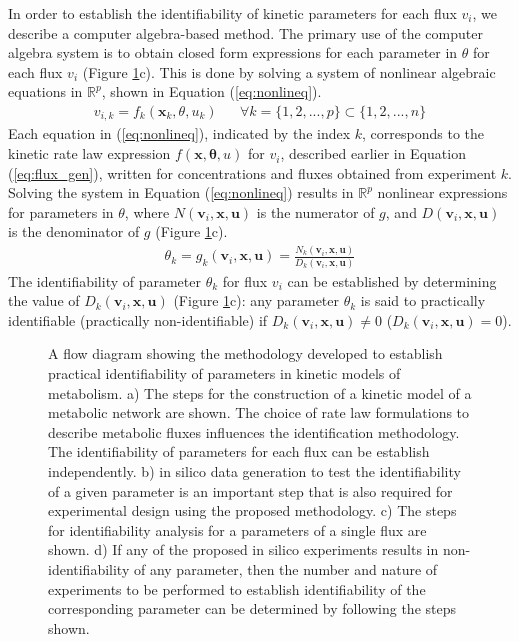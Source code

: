 \documentclass[10pt]{article}
\begin{document}
In order to establish the identifiability of kinetic parameters for each flux $v_i$, we describe a computer algebra-based method. The primary use of the computer algebra system is to obtain closed form expressions for each parameter in $\theta$ for each flux $v_i$ (Figure \ref{fig:ident-flowchart}c). This is done by solving a system of nonlinear algebraic equations in $\mathbb{R}^p$, shown in Equation (\ref{eq:nonlineq}).
\begin{align}\label{eq:nonlineq}
v_{i, k} = f_k(\mathbf{x}_k,\theta, u_k) && \forall k=\{1, 2, ..., p\}\subset\{1, 2, ..., n\}
\end{align}
Each equation in (\ref{eq:nonlineq}), indicated by the index $k$, corresponds to the kinetic rate law expression $f(\mathbf{x},\mathbf{\theta}, u)$ for $v_i$, described earlier in Equation (\ref{eq:flux_gen}), written for concentrations and fluxes obtained from experiment $k$. Solving the system in Equation (\ref{eq:nonlineq}) results in $\mathbb{R}^p$ nonlinear expressions for parameters in $\theta$, where $N(\mathbf{v}_i, \mathbf{x}, \mathbf{u})$ is the numerator of $g$, and $D(\mathbf{v}_i, \mathbf{x}, \mathbf{u})$ is the denominator of $g$ (Figure \ref{fig:ident-flowchart}c).
\begin{align}\label{eq:theta-eq}
\theta_k = g_k(\mathbf{v}_i, \mathbf{x}, \mathbf{u}) = \frac{N_k(\mathbf{v}_i, \mathbf{x}, \mathbf{u})}{D_k(\mathbf{v}_i, \mathbf{x}, \mathbf{u})}
\end{align}
The identifiability of parameter $\theta_k$ for flux $v_i$ can be established by determining the value of $D_k(\mathbf{v}_i, \mathbf{x}, \mathbf{u})$ (Figure \ref{fig:ident-flowchart}c): any parameter $\theta_k$ is said to practically identifiable (practically non-identifiable) if $D_k(\mathbf{v}_i, \mathbf{x}, \mathbf{u})\neq0$ ($D_k(\mathbf{v}_i, \mathbf{x}, \mathbf{u}) = 0$). 

\begin{figure}[!tbhp]
	\caption{A flow diagram showing the methodology developed to establish practical identifiability of parameters in kinetic models of metabolism. a) The steps for the construction of a kinetic model of a metabolic network are shown. The choice of rate law formulations to describe metabolic fluxes influences the identification methodology. The identifiability of parameters for each flux can be establish independently. b) in silico data generation to test the identifiability of a given parameter is an important step that is also required for experimental design using the proposed methodology. c) The steps for identifiability analysis for a parameters of a single flux are shown. d) If any of the proposed in silico experiments results in non-identifiability of any parameter, then the number and nature of experiments to be performed to establish identifiability of the corresponding parameter can be determined by following the steps shown.}\label{fig:ident-flowchart}
\end{figure}	
\end{document}

